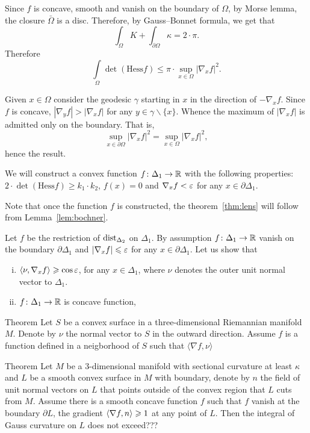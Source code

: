 Since $f$ is concave, smooth and vanish on the boundary of $\Omega$,
by Morse lemma, the closure $\bar\Omega$ is a disc.
Therefore, by Gauss--Bonnet formula, we get that
\[\int_\Omega K+\int_{\partial\Omega}\kappa=2\cdot\pi.\]
Therefore 
\[\int\limits_\Omega 
\det(\mathrm{Hess}f)
\le\pi\cdot\sup_{x\in\Omega}|\nabla_x f|^2.\]

Given $x\in\Omega$ consider the geodesic $\gamma$ starting in $x$ in the direction of $-\nabla_xf$.
Since $f$ is concave, $|\nabla_yf|>|\nabla_xf|$ for any $y\in \gamma\backslash\{x\}$.
Whence the maximum of $|\nabla_xf|$ is admitted only on the boundary.
That is,
\[\sup_{x\in\partial\Omega}|\nabla_x f|^2=\sup_{x\in\Omega}|\nabla_x f|^2,\]
hence the result.
\qeds


We will construct a convex function $f\colon\Delta_1\to \mathbb{R}$ with the following properties:
$2\cdot\det(\mathrm{Hess}f)\ge k_1\cdot k_2$,
$f(x)=0$ and
$\nabla_x f<\varepsilon$ for any $x\in \partial\Delta_1$.

Note that once the function $f$ is constructed, the theorem~\ref{thm:lens} will follow from Lemma~\ref{lem:bochner}.


Let $f$ be the restriction of $\operatorname{dist}_{\Delta_2}$ on $\Delta_1$.
By assumption $f\colon\Delta_1\to \mathbb{R}$ vanish on the boundary $\partial\Delta_1$
and
$|\nabla_x f|\leqslant \varepsilon$ for any $x\in \partial \Delta_1$.
Let us show that
\begin{enumerate}[(i)]
\item $\langle\nu,\nabla_x f\rangle\geqslant \cos\varepsilon$,
for any $x\in\Delta_1$, where $\nu$ denotes the outer unit normal vector to $\Delta_1$. 
\item $f\colon\Delta_1\to \mathbb{R}$ is concave function,
\end{enumerate}






\qeds



\begin{thm}{Theorem}
Let $S$ be a convex surface in a three-dimensional Riemannian manifold $M$.
Denote by $\nu$ the normal vector to $S$ in the outward direction.
Assume $f$ is a function defined in a neigborhood of $S$ such that 
$\langle \nabla f,\nu\rangle$
\end{thm}



\begin{thm}{Theorem}
Let $M$ be a 3-dimensional manifold with sectional curvature at least $\kappa$ and $L$ be a smooth convex surface in $M$ with boundary, denote by $n$ the field of unit normal vectors on $L$ that points outside of the convex region that $L$ cuts from $M$.
Assume there is a smooth concave function $f$ such that $f$ vanish at the boundary $\partial L$,
the gradient $\langle\nabla f,n\rangle\geqslant 1$ at any point of $L$.
Then the integral of Gauss curvature on $L$ does not exceed???
\end{thm}

